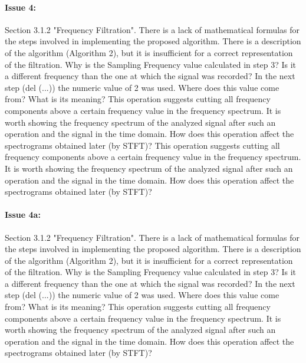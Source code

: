 \documentclass{article}
\begin{document}
\paragraph{Issue 4:}
\begin{displayquote}
Section 3.1.2 "Frequency Filtration". There is a lack of mathematical formulas for the steps involved in implementing the proposed algorithm. There is a description of the algorithm (Algorithm 2), but it is insufficient for a correct representation of the filtration. Why is the Sampling Frequency  value calculated in step 3? Is it a different frequency than the one at which the signal was recorded? In the next step (del (...)) the numeric value of 2 was used. Where does this value come from? What is its meaning? This operation suggests cutting all frequency components above a certain frequency value in the frequency spectrum. It is worth showing the frequency spectrum of the analyzed signal after such an operation and the signal in the time domain. How does this operation affect the spectrograms obtained later (by STFT)? This operation suggests cutting all frequency components above a certain frequency value in the frequency spectrum. It is worth showing the frequency spectrum of the analyzed signal after such an operation and the signal in the time domain. How does this operation affect the spectrograms obtained later (by STFT)?
\end{displayquote}

\paragraph{Issue 4a:}
\begin{displayquote}
Section 3.1.2 "Frequency Filtration". There is a lack of mathematical formulas for the steps involved in implementing the proposed algorithm. There is a description of the algorithm (Algorithm 2), but it is insufficient for a correct representation of the filtration. Why is the Sampling Frequency  value calculated in step 3? Is it a different frequency than the one at which the signal was recorded? In the next step (del (...)) the numeric value of 2 was used. Where does this value come from? What is its meaning? This operation suggests cutting all frequency components above a certain frequency value in the frequency spectrum. It is worth showing the frequency spectrum of the analyzed signal after such an operation and the signal in the time domain. How does this operation affect the spectrograms obtained later (by STFT)? 
\end{displayquote}
\end{document}
